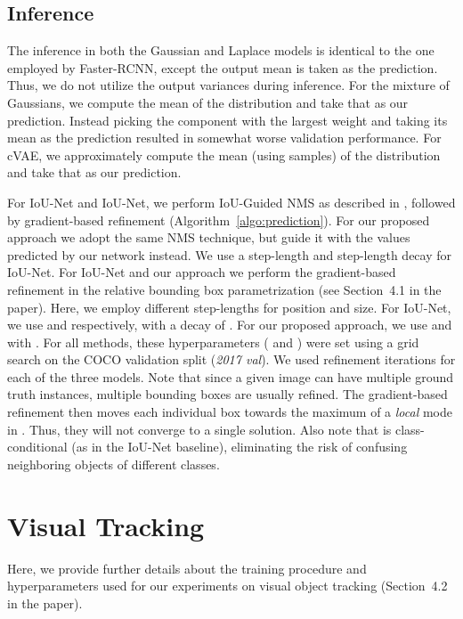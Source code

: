 \documentclass[runningheads]{llncs}
\begin{document}
\begin{appendices}
\subsection{Inference}
The inference in both the Gaussian and Laplace models is identical to the one employed by Faster-RCNN, except the output mean is taken as the prediction. Thus, we do not utilize the output variances during inference. For the mixture of  Gaussians, we compute the mean of the distribution and take that as our prediction. Instead picking the component with the largest weight and taking its mean as the prediction resulted in somewhat worse validation performance. For cVAE, we approximately compute the mean (using  samples) of the distribution and take that as our prediction.

For IoU-Net and IoU-Net, we perform IoU-Guided NMS as described in \cite{jiang2018acquisition}, followed by gradient-based refinement (Algorithm~\ref{algo:prediction}). For our proposed approach we adopt the same NMS technique, but guide it with the values  predicted by our network instead. We use a step-length  and step-length decay  for IoU-Net. For IoU-Net and our approach we perform the gradient-based refinement in the relative bounding box parametrization  (see Section~4.1 in the paper). Here, we employ different step-lengths for position and size. For IoU-Net, we use  and  respectively, with a decay of . For our proposed approach, we use  and   with . For all methods, these hyperparameters ( and ) were set using a grid search on the COCO validation split (\emph{2017 val}). We used  refinement iterations for each of the three models. Note that since a given image  can have multiple ground truth instances, multiple bounding boxes are usually refined. The gradient-based refinement then moves each individual box  towards the maximum of a \emph{local} mode in . Thus, they will not converge to a single solution. Also note that  is class-conditional (as in the IoU-Net baseline), eliminating the risk of confusing neighboring objects of different classes. \section{Visual Tracking}
\label{appendix:visual_tracking}

Here, we provide further details about the training procedure and hyperparameters used for our experiments on visual object tracking (Section~4.2 in the paper). 


\end{appendices}
\end{document}
